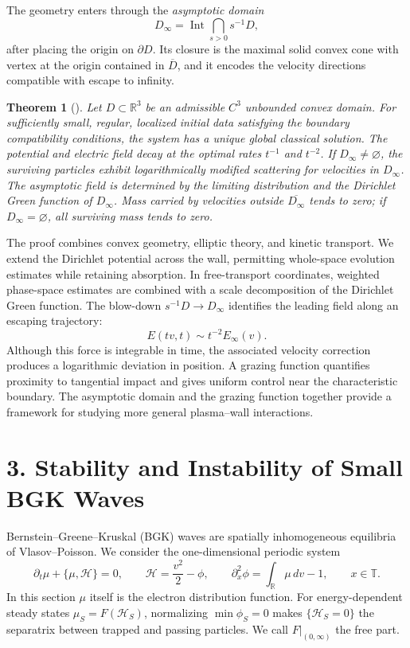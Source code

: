 \documentclass[10pt,reqno]{amsart}
\newtheorem{theorem}{Theorem}
\newcommand{\pr}{\partial}
\newcommand{\Ham}{\mathcal H}
\newcommand{\R}{\mathbb R}
\begin{document}
The geometry enters through the \emph{asymptotic domain}
\[
D_\infty=\operatorname{Int}\bigcap_{s>0}s^{-1}D,
\]
after placing the origin on $\partial D$. Its closure is the maximal solid convex cone with vertex at the origin contained in $\overline D$, and it encodes the velocity directions compatible with escape to infinity.
\begin{theorem}[\cite{HPS24}]\label{thm:wall}
Let $D\subset\R^3$ be an admissible $C^3$ unbounded convex domain. For sufficiently small, regular, localized initial data satisfying the boundary compatibility conditions, the system has a unique global classical solution. The potential and electric field decay at the optimal rates $t^{-1}$ and $t^{-2}$. If $D_\infty\neq\varnothing$, the surviving particles exhibit logarithmically modified scattering for velocities in $D_\infty$. The asymptotic field is determined by the limiting distribution and the Dirichlet Green function of $D_\infty$. Mass carried by velocities outside $\overline{D_\infty}$ tends to zero; if $D_\infty=\varnothing$, all surviving mass tends to zero.
\end{theorem}
The proof combines convex geometry, elliptic theory, and kinetic transport. We extend the Dirichlet potential across the wall, permitting whole-space evolution estimates while retaining absorption. In free-transport coordinates, weighted phase-space estimates are combined with a scale decomposition of the Dirichlet Green function. The blow-down $s^{-1}D\to D_\infty$ identifies the leading field along an escaping trajectory:
\[
E(tv,t)\sim t^{-2}E_\infty(v).
\]
Although this force is integrable in time, the associated velocity correction produces a logarithmic deviation in position. A grazing function quantifies proximity to tangential impact and gives uniform control near the characteristic boundary. The asymptotic domain and the grazing function together provide a framework for studying more general plasma--wall interactions.

\section*{3. Stability and Instability of Small BGK Waves}

Bernstein--Greene--Kruskal (BGK) waves \cite{BGK57} are spatially inhomogeneous equilibria of Vlasov--Poisson. We consider the one-dimensional periodic system
\begin{equation}\label{eq:bgk-vp}
\pr_t\mu+\{\mu,\Ham\}=0,\qquad
\Ham=\frac{v^2}{2}-\phi,\qquad
\pr_x^2\phi=\int_\R\mu\,dv-1,\qquad x\in\mathbb T.
\end{equation}
In this section $\mu$ itself is the electron distribution function. For energy-dependent steady states $\mu_S=F(\Ham_S)$, normalizing $\min\phi_S=0$ makes $\{\Ham_S=0\}$ the separatrix between trapped and passing particles. We call $F|_{(0,\infty)}$ the free part.
\end{document}
